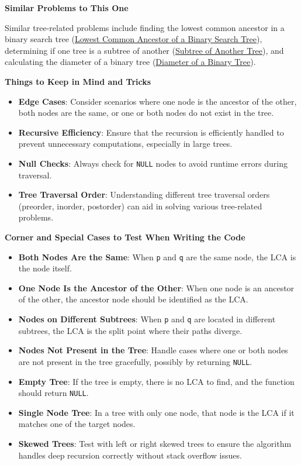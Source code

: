 \textbf{Similar Problems to This One}

Similar tree-related problems include finding the lowest common ancestor in a binary search tree (\hyperref[problem:lowest_common_ancestor_of_a_binary_search_tree]{Lowest Common Ancestor of a Binary Search Tree}), determining if one tree is a subtree of another (\hyperref[problem:subtree_of_another_tree]{Subtree of Another Tree}), and calculating the diameter of a binary tree (\hyperref[problem:binary_tree_diameter]{Diameter of a Binary Tree}).

\textbf{Things to Keep in Mind and Tricks}

\begin{itemize}
    \item \textbf{Edge Cases}: Consider scenarios where one node is the ancestor of the other, both nodes are the same, or one or both nodes do not exist in the tree.
    \item \textbf{Recursive Efficiency}: Ensure that the recursion is efficiently handled to prevent unnecessary computations, especially in large trees.
    \item \textbf{Null Checks}: Always check for \texttt{NULL} nodes to avoid runtime errors during traversal.
    \item \textbf{Tree Traversal Order}: Understanding different tree traversal orders (preorder, inorder, postorder) can aid in solving various tree-related problems.
\end{itemize}

\textbf{Corner and Special Cases to Test When Writing the Code}

\begin{itemize}
    \item \textbf{Both Nodes Are the Same}: When \texttt{p} and \texttt{q} are the same node, the LCA is the node itself.
    \item \textbf{One Node Is the Ancestor of the Other}: When one node is an ancestor of the other, the ancestor node should be identified as the LCA.
    \item \textbf{Nodes on Different Subtrees}: When \texttt{p} and \texttt{q} are located in different subtrees, the LCA is the split point where their paths diverge.
    \item \textbf{Nodes Not Present in the Tree}: Handle cases where one or both nodes are not present in the tree gracefully, possibly by returning \texttt{NULL}.
    \item \textbf{Empty Tree}: If the tree is empty, there is no LCA to find, and the function should return \texttt{NULL}.
    \item \textbf{Single Node Tree}: In a tree with only one node, that node is the LCA if it matches one of the target nodes.
    \item \textbf{Skewed Trees}: Test with left or right skewed trees to ensure the algorithm handles deep recursion correctly without stack overflow issues.
\end{itemize}

